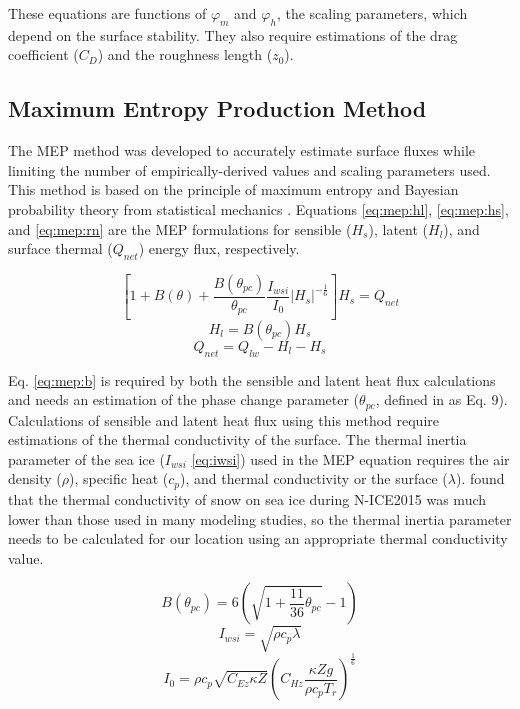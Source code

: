 These equations are functions of $\varphi_{m}$ and $\varphi_{h}$, the scaling parameters, which depend on the surface stability. They also require estimations of the drag coefficient ($C_{D}$) and the roughness length ($z_{0}$).

\subsection{Maximum Entropy Production Method} 
The MEP method was developed to accurately estimate surface fluxes while limiting the number of empirically-derived values and scaling parameters used. This method is based on the principle of maximum entropy and Bayesian probability theory from statistical mechanics \citep{wang:2014}. Equations \ref{eq:mep:hl}, \ref{eq:mep:hs}, and \ref{eq:mep:rn} are the MEP formulations for sensible ($H_{s}$), latent ($H_{l}$), and surface thermal ($Q_{net}$) energy flux, respectively. 

\begin{equation}\label{eq:mep:rn}
\left[ 1 + B(\theta) + \frac{B(\theta_{pc})}{\theta_{pc}} \frac{I_{wsi}}{I_{0}} | H_{s} | ^{-\frac{1}{6}} \right] H_{s} = Q_{net}
\end{equation}
\begin{equation}\label{eq:mep:hl}
H_{l} = B(\theta_{pc}) H_{s}
\end{equation}
\begin{equation}\label{eq:mep:hs}
Q_{net} = Q_{lw} - H_{l} - H_{s}
\end{equation}

Eq. \ref{eq:mep:b} is required by both the sensible and latent heat flux calculations and needs an estimation of the phase change parameter ($\theta_{pc}$, defined in \citep{wang:2011} as Eq. 9). Calculations of sensible and latent heat flux using this method require estimations of the thermal conductivity \citep{wang:2014} of the surface. The thermal inertia parameter of the sea ice ($I_{wsi}$ \ref{eq:iwsi}) used in the MEP equation requires the air density ($\rho$), specific heat ($c_{p}$), and thermal conductivity or the surface ($\lambda$). \citet{merkouriadi:2017} found that the thermal conductivity of snow on sea ice during N-ICE2015 was much lower than those used in many modeling studies, so the thermal inertia parameter needs to be calculated for our location using an appropriate thermal conductivity value. 

\begin{equation}\label{eq:mep:b}
B(\theta_{pc}) = 6 \left( \sqrt{1 + \frac{11}{36} \theta_{pc}} - 1 \right)
\end{equation}
\begin{equation}\label{eq:iwsi}
I_{wsi} = \sqrt{\rho c_{p} \lambda}
\end{equation}
\begin{equation}\label{eq:i0}
I_{0} = \rho c_{p} \sqrt{C_{Ez}\kappa Z} \left( C_{Hz} \frac{\kappa Zg}{\rho c_{p} T_{r}} \right)^{\frac{1}{6}}
\end{equation}

